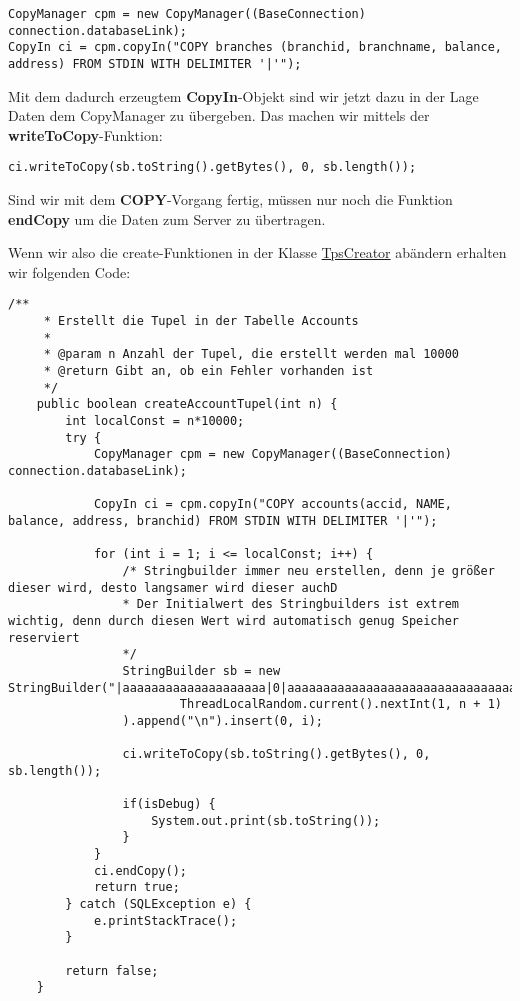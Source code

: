 \begin{lstlisting}[caption={Instantiierung des CopyManagers}]
CopyManager cpm = new CopyManager((BaseConnection) connection.databaseLink);
CopyIn ci = cpm.copyIn("COPY branches (branchid, branchname, balance, address) FROM STDIN WITH DELIMITER '|'");
\end{lstlisting}

Mit dem dadurch erzeugtem \textbf{CopyIn}-Objekt sind wir jetzt dazu in der Lage
Daten dem CopyManager zu übergeben. Das machen wir mittels der
\textbf{writeToCopy}-Funktion:

\begin{lstlisting}[caption={WriteToCopy-Funktion}]
ci.writeToCopy(sb.toString().getBytes(), 0, sb.length());
\end{lstlisting}

Sind wir mit dem \textbf{COPY}-Vorgang fertig, müssen nur noch die Funktion
\textbf{endCopy} um die Daten zum Server zu übertragen.

Wenn wir also die create-Funktionen in der Klasse
\hyperref[lst:tpsv2]{TpsCreator} abändern erhalten wir folgenden Code:

\begin{lstlisting}[caption={createAccountTupel mit CopyManager}]
	/**
	 * Erstellt die Tupel in der Tabelle Accounts
	 * 
	 * @param n Anzahl der Tupel, die erstellt werden mal 10000
	 * @return Gibt an, ob ein Fehler vorhanden ist
	 */
	public boolean createAccountTupel(int n) {
		int localConst = n*10000;
		try {
			CopyManager cpm = new CopyManager((BaseConnection) connection.databaseLink);
			
			CopyIn ci = cpm.copyIn("COPY accounts(accid, NAME, balance, address, branchid) FROM STDIN WITH DELIMITER '|'");

			for (int i = 1; i <= localConst; i++) {
				/* Stringbuilder immer neu erstellen, denn je größer dieser wird, desto langsamer wird dieser auchD
				* Der Initialwert des Stringbuilders ist extrem wichtig, denn durch diesen Wert wird automatisch genug Speicher reserviert
				*/
				StringBuilder sb = new StringBuilder("|aaaaaaaaaaaaaaaaaaaa|0|aaaaaaaaaaaaaaaaaaaaaaaaaaaaaaaaaaaaaaaaaaaaaaaaaaaaaaaaaaaaaaaaaaaa|").append(
						ThreadLocalRandom.current().nextInt(1, n + 1)
				).append("\n").insert(0, i);
				
				ci.writeToCopy(sb.toString().getBytes(), 0, sb.length());
				
				if(isDebug) {
					System.out.print(sb.toString());
				}
			}
	        ci.endCopy();			
			return true;
		} catch (SQLException e) {
			e.printStackTrace();
		}
		
		return false;
	}
\end{lstlisting}

